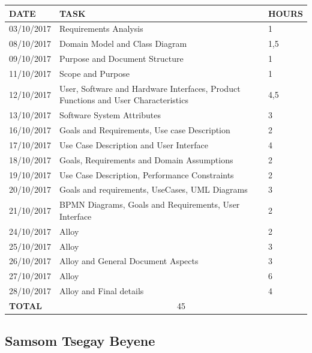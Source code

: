\documentclass[12pt]{article}
\begin{document}
\begin{center}
\begin{tabular}{ |p{}|p{}|p{}| } 
 \hline
 \textbf{DATE} & \textbf{TASK} & \textbf{HOURS} \\ 
  \hline
 03/10/2017 & Requirements Analysis & 1 \\ 
  \hline
 08/10/2017 & Domain Model and Class Diagram & 1,5 \\ 
  \hline
  09/10/2017 & Purpose and Document Structure & 1 \\ 
  \hline
  11/10/2017 & Scope and Purpose & 1 \\ 
  \hline
  12/10/2017 & User, Software and Hardware Interfaces, Product Functions and User Characteristics & 4,5 \\ 
  \hline
  13/10/2017 & Software System Attributes & 3 \\ 
  \hline
  16/10/2017 & Goals and Requirements, Use case Description & 2 \\ 
  \hline
  17/10/2017 & Use Case Description and User Interface & 4 \\ 
  \hline
  18/10/2017 & Goals, Requirements and Domain Assumptions & 2 \\ 
  \hline
  19/10/2017 & Use Case Description, Performance Constraints & 2 \\ 
  \hline
  20/10/2017 & Goals and requirements, UseCases, UML Diagrams & 3 \\ 
  \hline
  21/10/2017 & BPMN Diagrams, Goals and Requirements, User Interface & 2 \\ 
  \hline
  24/10/2017 & Alloy & 2 \\ 
  \hline
  25/10/2017 & Alloy & 3 \\ 
  \hline
  26/10/2017 & Alloy and General Document Aspects & 3 \\ 
  \hline
  27/10/2017 & Alloy & 6 \\ 
  \hline
  28/10/2017 & Alloy and Final details & 4 \\ 
  \hline
  \textbf{TOTAL} & \multicolumn{2}{c|}{45} \\ 
  \hline
\end{tabular}
\end{center}

\subsection{Samsom Tsegay Beyene}
\end{document}
